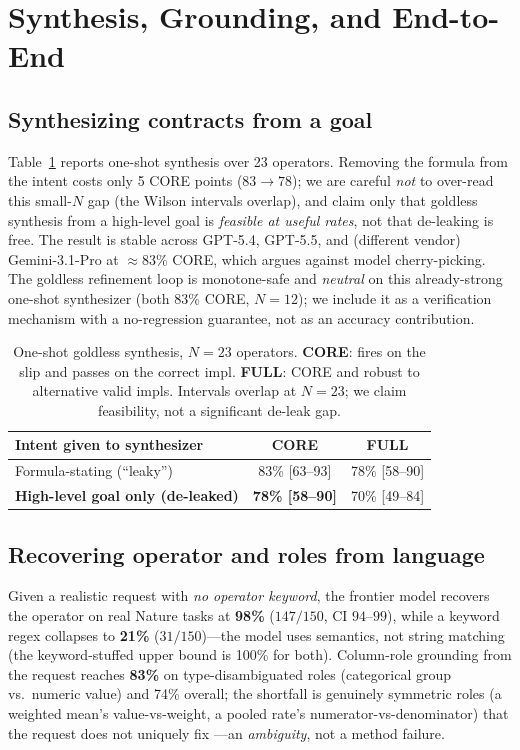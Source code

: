 \documentclass[10pt,twocolumn,letterpaper]{article}
\begin{document}
\section{Synthesis, Grounding, and End-to-End}\label{sec:synth}
\subsection{Synthesizing contracts from a goal}
Table~\ref{tab:synth} reports one-shot synthesis over 23 operators. Removing the
formula from the intent costs only 5 CORE points ($83{\to}78$); we are careful
\emph{not} to over-read this small-$N$ gap (the Wilson intervals overlap), and
claim only that goldless synthesis from a high-level goal is \emph{feasible at
useful rates}, not that de-leaking is free. The result is stable across GPT-5.4,
GPT-5.5, and (different vendor) Gemini-3.1-Pro at $\approx$83\% CORE, which
argues against model cherry-picking. The goldless refinement loop is
monotone-safe and \emph{neutral} on this already-strong one-shot synthesizer
(both 83\% CORE, $N{=}12$); we include it as a verification mechanism with a
no-regression guarantee, not as an accuracy contribution.

\begin{table}[t]\centering\small
\begin{tabular}{@{}lcc@{}}
\toprule
Intent given to synthesizer & CORE & FULL\\
\midrule
Formula-stating (``leaky'') & 83\% [63--93] & 78\% [58--90]\\
\textbf{High-level goal only (de-leaked)} & \textbf{78\% [58--90]} & 70\% [49--84]\\
\bottomrule
\end{tabular}
\caption{One-shot goldless synthesis, $N{=}23$ operators. \textbf{CORE}: fires
on the slip and passes on the correct impl. \textbf{FULL}: CORE and robust to
alternative valid impls. Intervals overlap at $N{=}23$; we claim feasibility,
not a significant de-leak gap.}
\label{tab:synth}
\end{table}

\subsection{Recovering operator and roles from language}
Given a realistic request with \emph{no operator keyword}, the frontier model
recovers the operator on real Nature tasks at \textbf{98\%} ($147/150$, CI
$94$--$99$), while a keyword regex collapses to \textbf{21\%} ($31/150$)---the
model uses semantics, not string matching (the keyword-stuffed upper bound is
100\% for both). Column-role grounding from the request reaches \textbf{83\%} on
type-disambiguated roles (categorical group vs.\ numeric value) and 74\% overall;
the shortfall is genuinely symmetric roles (a weighted mean's value-vs-weight, a
pooled rate's numerator-vs-denominator) that the request does not uniquely fix
---an \emph{ambiguity}, not a method failure.
\end{document}
